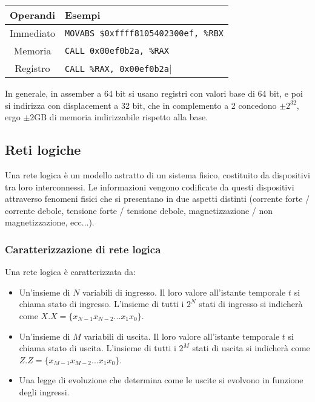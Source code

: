 \documentclass[a4paper,11pt]{article}
\begin{document}
		\begin{table}[H]
		\center {}
			\begin{tabular} { c | p{5cm} }
				\bfseries Operandi & \bfseries Esempi \\
				\hline
				Immediato & \lstinline|MOVABS $0xffff8105402300ef, %RBX| \\ 
				Memoria & \lstinline|CALL 0x00ef0b2a, %RAX| \\ 
				Registro & \lstinline|CALL %RAX, 0x00ef0b2a|
			\end{tabular}
		\end{table}

\par\smallskip 
In generale, in assember a 64 bit si usano registri con valori base di 64 bit, e poi si indirizza con displacement a 32 bit, che in complemento a 2 concedono $\pm 2^{32}$, ergo $\pm 2 \mathrm{GB}$ di memoria indirizzabile rispetto alla base.

\subsection{Reti logiche}
Una rete logica è un modello astratto di un sistema fisico, costituito da dispositivi tra loro interconnessi.
Le informazioni vengono codificate da questi dispositivi attraverso fenomeni fisici che si presentano in due aspetti distinti (corrente forte / corrente debole, tensione forte / tensione debole, magnetizzazione / non magnetizzazione, ecc...).

\subsubsection{Caratterizzazione di rete logica}
Una rete logica è caratterizzata da:
\begin{itemize}
	\item Un'insieme di $N$ variabili di ingresso. Il loro valore all'istante temporale $t$ si chiama stato di ingresso. L'insieme di tutti i $2^N$ stati di ingresso si indicherà come $X.X = \{ x_{N-1} x_{N-2} ... x_1 x_0 \}$. 
	\item Un'insieme di $M$ variabili di uscita. Il loro valore all'istante temporale $t$ si chiama stato di uscita. L'insieme di tutti i $2^M$ stati di uscita si indicherà come $Z.Z = \{ x_{M-1} x_{M-2} ... x_1 x_0 \}$. 
	\item Una legge di evoluzione che determina come le uscite si evolvono in funzione degli ingressi.
\end{itemize}
\end{document}
